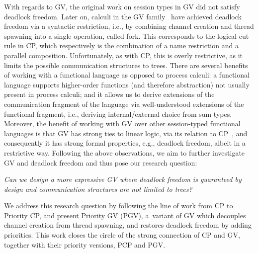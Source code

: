 \documentclass[main.tex]{subfiles}
\begin{document}
With regards to GV, the original work on session types in GV \cite{gayvasconcelos10,gayvasconcelos12} did not satisfy deadlock freedom. Later on, calculi in the GV family~\cite{wadler15,lindleymorris15} have achieved deadlock freedom via a syntactic restriction, i.e., by combining channel creation and thread spawning into a single operation, called fork. This corresponds to the logical cut rule in CP, which respectively is the combination of a name restriction and a parallel composition.
Unfortunately, as with CP, this is overly restrictive, as it limits the possible communication structures to trees.
There are several benefits of working with a functional language as opposed to process calculi: a functional language supports higher-order functions (and therefore abstraction) not usually present in process calculi; and it allows us to derive extensions of the communication fragment of the language via well-understood extensions of the functional fragment, i.e., deriving internal/external choice from sum types. Moreover, the benefit of working with GV over other session-typed functional languages is that GV has strong ties to linear logic, via its relation to CP~\cite{wadler12}, and consequently it has strong formal properties, e.g., deadlock freedom, albeit in a restrictive way.
Following the above observations, we aim to further investigate GV and deadlock freedom and thus pose our research question:

\emph{Can we design a more expressive GV where deadlock freedom is guaranteed by design and communication structures are not limited to trees?}

We address this research question by following the line of work from CP to Priority CP, and present
Priority GV (PGV), a~variant of GV which decouples channel creation from thread spawning, and restores deadlock freedom by adding priorities. This work closes the circle of the strong connection of CP and GV, together with their priority versions, PCP and PGV.
\end{document}
